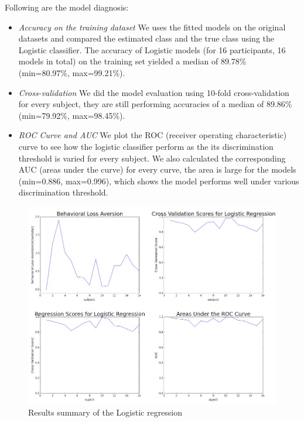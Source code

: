 \documentclass[11pt]{article}
\begin{document}
Following are the model diagnosis:

\begin{itemize}
\item \emph{Accuracy on the training dataset} We uses the fitted models on the original datasets and compared the estimated class and the true class using the Logistic classifier. The accuracy of Logistic models (for 16 participants, 16 models in total) on the training set yielded a median of 89.78\% (min=80.97\%, max=99.21\%).
\item \emph{Cross-validation} We did the model evaluation using 10-fold cross-validation for every subject, they are still performing accuracies of a median of 89.86\% (min=79.92\%, max=98.45\%).
\item \emph{ROC Curve and AUC} We plot the ROC (receiver operating characteristic) curve to see how the logistic classifier perform as the its discrimination threshold is varied for every subject. We also calculated the corresponding AUC (areas under the curve) for every curve, the area is large for the models (min=0.886, max=0.996), which shows the model performs well under various discrimination threshold.

\end{itemize}

\begin{figure}[H]
    \centering
        \includegraphics[scale=0.4]{figures/Regression1/logistic_summary.png}
    \caption{Results summary of the Logistic regression}
\end{figure}
\end{document}
